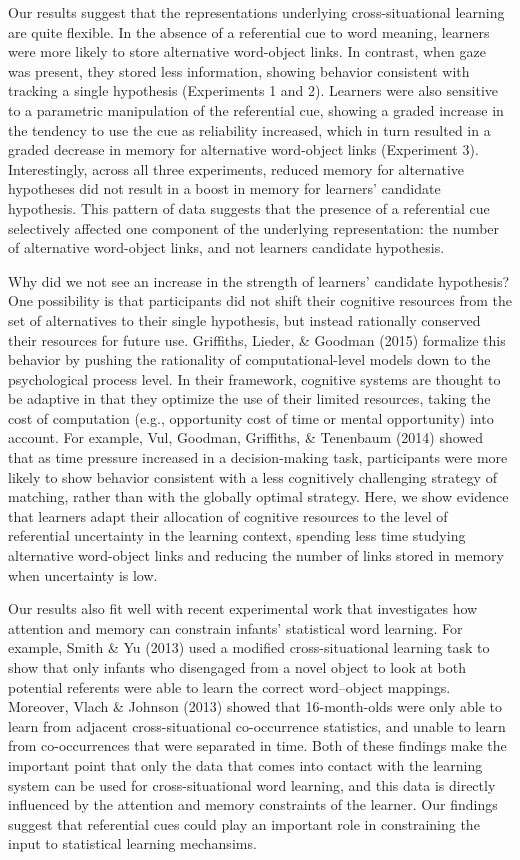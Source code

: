\documentclass[a4paper,man,natbib]{apa6}
\begin{document}
Our results suggest that the representations underlying
cross-situational learning are quite flexible. In the absence of a
referential cue to word meaning, learners were more likely to store
alternative word-object links. In contrast, when gaze was present, they
stored less information, showing behavior consistent with tracking a
single hypothesis (Experiments 1 and 2). Learners were also sensitive to
a parametric manipulation of the referential cue, showing a graded
increase in the tendency to use the cue as reliability increased, which
in turn resulted in a graded decrease in memory for alternative
word-object links (Experiment 3). Interestingly, across all three
experiments, reduced memory for alternative hypotheses did not result in
a boost in memory for learners' candidate hypothesis. This pattern of
data suggests that the presence of a referential cue selectively
affected one component of the underlying representation: the number of
alternative word-object links, and not learners candidate hypothesis.

Why did we not see an increase in the strength of learners' candidate
hypothesis? One possibility is that participants did not shift their
cognitive resources from the set of alternatives to their single
hypothesis, but instead rationally conserved their resources for future
use. Griffiths, Lieder, \& Goodman (2015) formalize this behavior by
pushing the rationality of computational-level models down to the
psychological process level. In their framework, cognitive systems are
thought to be adaptive in that they optimize the use of their limited
resources, taking the cost of computation (e.g., opportunity cost of
time or mental opportunity) into account. For example, Vul, Goodman,
Griffiths, \& Tenenbaum (2014) showed that as time pressure increased in
a decision-making task, participants were more likely to show behavior
consistent with a less cognitively challenging strategy of matching,
rather than with the globally optimal strategy. Here, we show evidence
that learners adapt their allocation of cognitive resources to the level
of referential uncertainty in the learning context, spending less time
studying alternative word-object links and reducing the number of links
stored in memory when uncertainty is low.

Our results also fit well with recent experimental work that
investigates how attention and memory can constrain infants' statistical
word learning. For example, Smith \& Yu (2013) used a modified
cross-situational learning task to show that only infants who disengaged
from a novel object to look at both potential referents were able to
learn the correct word--object mappings. Moreover, Vlach \& Johnson
(2013) showed that 16-month-olds were only able to learn from adjacent
cross-situational co-occurrence statistics, and unable to learn from
co-occurrences that were separated in time. Both of these findings make
the important point that only the data that comes into contact with the
learning system can be used for cross-situational word learning, and
this data is directly influenced by the attention and memory constraints
of the learner. Our findings suggest that referential cues could play an
important role in constraining the input to statistical learning
mechansims.
\end{document}
